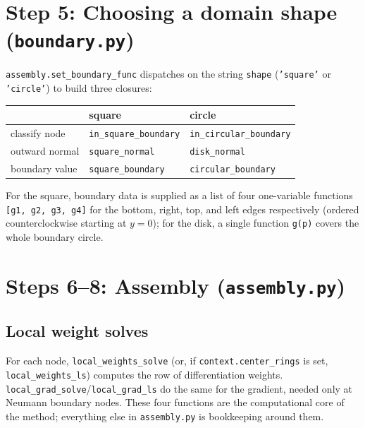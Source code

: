 \documentclass[11pt]{article}
\begin{document}
\section{Step 5: Choosing a domain shape (\texttt{boundary.py})}

\texttt{assembly.set\_boundary\_func} dispatches on the string
\texttt{shape} (\texttt{'square'} or \texttt{'circle'}) to build three
closures:

\begin{center}
\begin{tabular}{@{}lll@{}}
\toprule
& \textbf{square} & \textbf{circle} \\
\midrule
classify node & \texttt{in\_square\_boundary} & \texttt{in\_circular\_boundary} \\
outward normal & \texttt{square\_normal} & \texttt{disk\_normal} \\
boundary value & \texttt{square\_boundary} & \texttt{circular\_boundary} \\
\bottomrule
\end{tabular}
\end{center}

For the square, boundary data is supplied as a list of four
one-variable functions \texttt{[g1, g2, g3, g4]} for the bottom,
right, top, and left edges respectively (ordered counterclockwise
starting at $y=0$); for the disk, a single function \texttt{g(p)}
covers the whole boundary circle.

\section{Steps 6--8: Assembly (\texttt{assembly.py})}

\subsection{Local weight solves}

For each node, \texttt{local\_weights\_solve} (or, if
\texttt{context.center\_rings} is set, \texttt{local\_weights\_ls})
computes the row of differentiation weights.
\texttt{local\_grad\_solve}/\texttt{local\_grad\_ls} do the same for
the gradient, needed only at Neumann boundary nodes. These four
functions are the computational core of the method; everything else
in \texttt{assembly.py} is bookkeeping around them.
\end{document}
